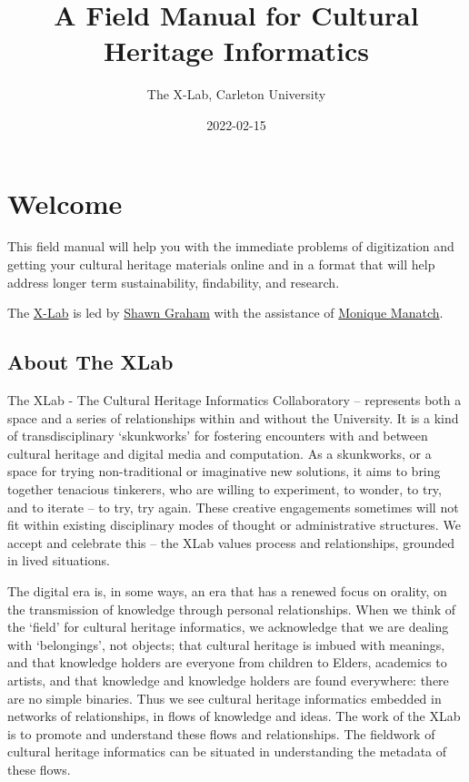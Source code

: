 \documentclass[
]{book}
\title{A Field Manual for Cultural Heritage Informatics}
\author{The X-Lab, Carleton University}
\date{2022-02-15}
\begin{document}
\maketitle

{
\setcounter{tocdepth}{1}
\tableofcontents
}
\hypertarget{welcome}{%
\chapter{Welcome}\label{welcome}}

This field manual will help you with the immediate problems of digitization and getting your cultural heritage materials online and in a format that will help address longer term sustainability, findability, and research.

The \href{https://carleton.ca/xlab}{X-Lab} is led by \href{https://shawngraham.github.io}{Shawn Graham} with the assistance of \href{https://icmi.ca}{Monique Manatch}.

\hypertarget{about-the-xlab}{%
\section{About The XLab}\label{about-the-xlab}}

The XLab - The Cultural Heritage Informatics Collaboratory -- represents both a space and a series of relationships within and without the University. It is a kind of transdisciplinary `skunkworks' for fostering encounters with and between cultural heritage and digital media and computation. As a skunkworks, or a space for trying non-traditional or imaginative new solutions, it aims to bring together tenacious tinkerers, who are willing to experiment, to wonder, to try, and to iterate -- to try, try again. These creative engagements sometimes will not fit within existing disciplinary modes of thought or administrative structures. We accept and celebrate this -- the XLab values process and relationships, grounded in lived situations.

The digital era is, in some ways, an era that has a renewed focus on orality, on the transmission of knowledge through personal relationships. When we think of the `field' for cultural heritage informatics, we acknowledge that we are dealing with `belongings', not objects; that cultural heritage is imbued with meanings, and that knowledge holders are everyone from children to Elders, academics to artists, and that knowledge and knowledge holders are found everywhere: there are no simple binaries. Thus we see cultural heritage informatics embedded in networks of relationships, in flows of knowledge and ideas. The work of the XLab is to promote and understand these flows and relationships. The fieldwork of cultural heritage informatics can be situated in understanding the metadata of these flows.
\end{document}
